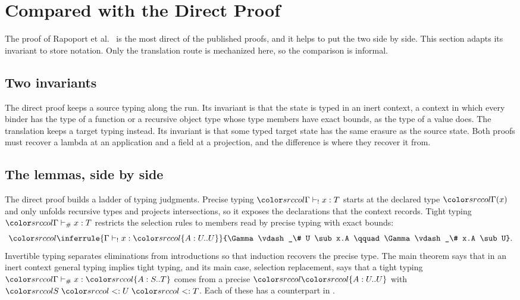 \mathplain
\section{Compared with the Direct Proof}\label{sec:comparison}

The proof of Rapoport et al.\ \cite{rapoport2017simple} is the most direct of the published proofs, and it helps to put the two side by side. This section adapts its invariant to store notation. Only the translation route is mechanized here, so the comparison is informal.

\subsection{Two invariants}

The direct proof keeps a source typing along the run. Its invariant is that the state is typed in an inert context, a context in which every binder has the type of a function or a recursive object type whose type members have exact bounds, as the type of a value does. The translation keeps a target typing instead. Its invariant is that some typed target state has the same erasure as the source state. Both proofs must recover a lambda at an application and a field at a projection, and the difference is where they recover it from.

\subsection{The lemmas, side by side}

The direct proof builds a ladder of typing judgments. Precise typing $\src{\Gamma \vdash_! x : T}$ starts at the declared type $\src{\Gamma(x)}$ and only unfolds recursive types and projects intersections, so it exposes the declarations that the context records. Tight typing $\src{\Gamma \vdash_\# x : T}$ restricts the selection rules to members read by precise typing with exact bounds:
\[
\src{\inferrule{\Gamma \vdash_! x : \dtyp{A}{U}{U}}{\Gamma \vdash_\# U \sub x.A \qquad \Gamma \vdash_\# x.A \sub U}} .
\]
Invertible typing separates eliminations from introductions so that induction recovers the precise type. The main theorem says that in an inert context general typing implies tight typing, and its main case, selection replacement, says that a tight typing $\src{\Gamma \vdash_\# x : \dtyp{A}{S}{T}}$ comes from a precise $\src{\dtyp{A}{U}{U}}$ with $\src{S \sub U \sub T}$. Each of these has a counterpart in \FCdot.

